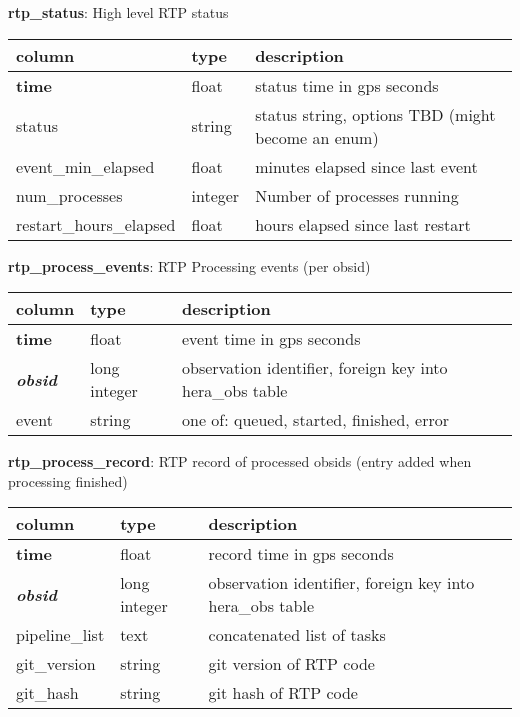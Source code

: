 \documentclass{article}
\begin{document}
\textbf{\large{rtp\_status}}: High level RTP status
\begin{center}
 \begin{tabular}{| p{4cm} | p{2cm} | p{10cm} |} 
\hline
 column & type & description \\ [0.5ex]  \hline\hline
\textbf{time} & float & status time in gps seconds\\ \hline
status & string & status string, options TBD (might become an enum) \\\hline
event\_min\_elapsed & float & minutes elapsed since last event \\\hline
num\_processes & integer & Number of processes running  \\\hline
restart\_hours\_elapsed & float & hours elapsed since last restart \\\hline
\end{tabular}
\end{center}

\textbf{\large{rtp\_process\_events}}: RTP Processing events (per obsid)
\begin{center}
 \begin{tabular}{| p{4cm} | p{2cm} | p{10cm} |} 
\hline
 column & type & description \\ [0.5ex]  \hline\hline
\textbf{time} & float & event time in gps seconds \\ \hline
\textit{\textbf{obsid}} & long integer & observation identifier, foreign key into hera\_obs table \\ \hline
event & string & one of: queued, started, finished, error  \\\hline
\end{tabular}
\end{center}

\textbf{\large{rtp\_process\_record}}: RTP record of processed obsids (entry added when processing finished)
\begin{center}
 \begin{tabular}{| p{4cm} | p{2cm} | p{10cm} |} 
\hline
 column & type & description \\ [0.5ex]  \hline\hline
\textbf{time} & float & record time in gps seconds\\ \hline
\textit{\textbf{obsid}} & long integer & observation identifier, foreign key into hera\_obs table \\ \hline
pipeline\_list & text & concatenated list of tasks  \\\hline
git\_version & string & git version of RTP code  \\\hline
git\_hash & string & git hash of RTP code  \\\hline
\end{tabular}
\end{center}
\end{document}
